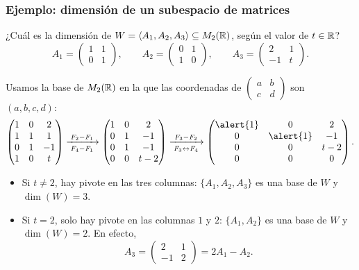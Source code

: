 \begin{frame}[allowframebreaks, t]
    \frametitle{Ejemplo: dimensión de un subespacio de matrices}

    \begin{example}
        ¿Cuál es la dimensión de $W=\langle A_1,A_2,A_3\rangle\subseteq M_2(\mathbb{R})$,
        según el valor de $t\in\mathbb{R}$?
        \[
            A_1=\begin{pmatrix}1&1\\0&1\end{pmatrix},
            \qquad
            A_2=\begin{pmatrix}0&1\\1&0\end{pmatrix},
            \qquad
            A_3=\begin{pmatrix}2&1\\-1&t\end{pmatrix}.
        \]
    \end{example}

    Usamos la base de $M_2(\mathbb{R})$ en la que las coordenadas de
    $\begin{pmatrix}a&b\\c&d\end{pmatrix}$ son $(a,b,c,d)$:
    \[
        \begin{pmatrix}
            1&0&2\\
            1&1&1\\
            0&1&-1\\
            1&0&t
        \end{pmatrix}
        \xrightarrow[\;F_4-F_1\;]{\;F_2-F_1\;}
        \begin{pmatrix}
            1&0&2\\
            0&1&-1\\
            0&1&-1\\
            0&0&t-2
        \end{pmatrix}
        \xrightarrow[\;F_3\leftrightarrow F_4\;]{\;F_3-F_2\;}
        \begin{pmatrix}
            \alert{1}&0&2\\
            0&\alert{1}&-1\\
            0&0&t-2\\
            0&0&0
        \end{pmatrix}.
    \]

    \framebreak

    \begin{itemize}
        \item Si $t\neq2$, hay pivote en las tres columnas: $\{A_1,A_2,A_3\}$
        es una base de $W$ y $\dim(W)=3$.
        \item Si $t=2$, solo hay pivote en las columnas $1$ y $2$:
        $\{A_1,A_2\}$ es una base de $W$ y $\dim(W)=2$. En efecto,
        \[
            A_3=\begin{pmatrix}2&1\\-1&2\end{pmatrix}=2A_1-A_2.
        \]
    \end{itemize}


\end{frame}
